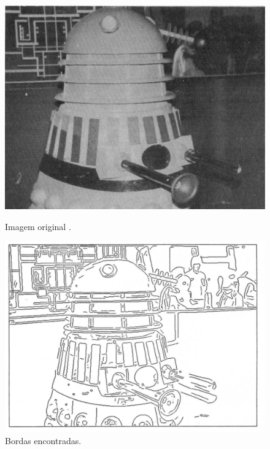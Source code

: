 \begin{figure}[H]
	\begin{minipage}[b]{0.45\linewidth}
		\centering
	\includegraphics[width=\textwidth]{cannydalek.pdf}
				\caption{Imagem original \cite{Canny:1986}.}
				\label{fig:cannyantes}
		
	\end{minipage}
	\hspace{0.5cm}
	\begin{minipage}[b]{0.45\linewidth}
		\centering
	\includegraphics[width=\textwidth]{cannydalekdepois.pdf}
				\caption{Bordas encontradas\cite{Canny:1986}.}
					\label{fig:cannydepois}
	\end{minipage}
\end{figure}



